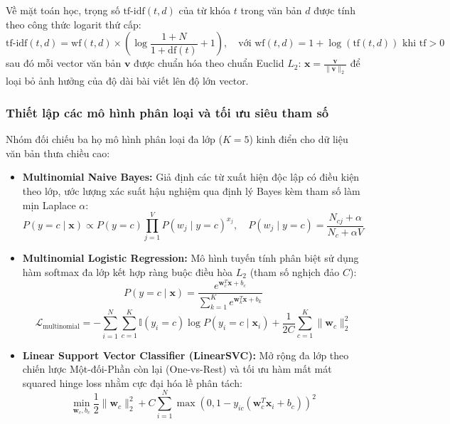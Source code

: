 Về mặt toán học, trọng số $\text{tf-idf}(t, d)$ của từ khóa $t$ trong văn bản $d$ được tính theo công thức logarit thứ cấp:
\begin{equation}
  \text{tf-idf}(t, d) = \text{wf}(t, d) \times \left( \log \frac{1 + N}{1 + \text{df}(t)} + 1 \right), \quad \text{với } \text{wf}(t, d) = 1 + \log(\text{tf}(t, d)) \text{ khi } \text{tf} > 0
  \label{eq:tfidf}
\end{equation}
sau đó mỗi vector văn bản $\mathbf{v}$ được chuẩn hóa theo chuẩn Euclid $L_2$: $\mathbf{x} = \frac{\mathbf{v}}{\|\mathbf{v}\|_2}$ để loại bỏ ảnh hưởng của độ dài bài viết lên độ lớn vector.

\subsubsection{Thiết lập các mô hình phân loại và tối ưu siêu tham số}
Nhóm đối chiếu ba họ mô hình phân loại đa lớp ($K = 5$) kinh điển cho dữ liệu văn bản thưa chiều cao:
\begin{itemize}[leftmargin=*]
  \item \textbf{Multinomial Naive Bayes:} Giả định các từ xuất hiện độc lập có điều kiện theo lớp, ước lượng xác suất hậu nghiệm qua định lý Bayes kèm tham số làm mịn Laplace $\alpha$:
  \begin{equation}
    P(y = c \mid \mathbf{x}) \propto P(y = c) \prod_{j=1}^{V} P(w_j \mid y = c)^{x_j}, \quad P(w_j \mid y = c) = \frac{N_{cj} + \alpha}{N_c + \alpha V}
    \label{eq:nb_formula}
  \end{equation}
  \item \textbf{Multinomial Logistic Regression:} Mô hình tuyến tính phân biệt sử dụng hàm softmax đa lớp kết hợp ràng buộc điều hòa $L_2$ (tham số nghịch đảo $C$):
  \begin{equation}
    P(y = c \mid \mathbf{x}) = \frac{e^{\mathbf{w}_c^T \mathbf{x} + b_c}}{\sum_{k=1}^{K} e^{\mathbf{w}_k^T \mathbf{x} + b_k}}
    \label{eq:softmax_prob}
  \end{equation}
  \begin{equation}
    \mathcal{L}_{\text{multinomial}} = -\sum_{i=1}^{N} \sum_{c=1}^{K} \mathbb{I}(y_i = c) \log P(y_i = c \mid \mathbf{x}_i) + \frac{1}{2C} \sum_{c=1}^{K} \|\mathbf{w}_c\|_2^2
    \label{eq:softmax_loss}
  \end{equation}
  \item \textbf{Linear Support Vector Classifier (LinearSVC):} Mở rộng đa lớp theo chiến lược Một-đối-Phần còn lại (One-vs-Rest) và tối ưu hàm mất mát squared hinge loss nhằm cực đại hóa lề phân tách:
  \begin{equation}
    \min_{\mathbf{w}_c, b_c} \frac{1}{2} \|\mathbf{w}_c\|_2^2 + C \sum_{i=1}^{N} \max\left(0, 1 - y_{ic} (\mathbf{w}_c^T \mathbf{x}_i + b_c)\right)^2
    \label{eq:svc_loss}
  \end{equation}
\end{itemize}

